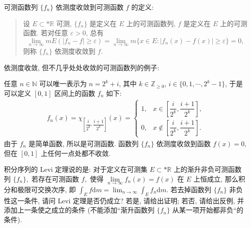 \begin{solution}
可测函数列 \(\{f_n\}\) 依测度收敛到可测函数 \(f\) 的定义: 

\begin{quote}
设 \(E \subset* \mathbb{R}\) 可测, \(\{f_n\}\) 是定义在 \(E\) 上的可测函数列, \(f\) 是定义在 \(E\) 上的可测函数. 若对任意 \(\varepsilon > 0\), 总有
\[\lim\limits_{n\to\infty} m E (\lvert f_n - f \rvert \geqslant \varepsilon) = \lim\limits_{n\to\infty} m \{ x \in E \colon \lvert f_n(x) - f(x) \rvert \geqslant \varepsilon \} = 0,\]
则称 \(\{f_n\}\) 依测度收敛到 \(f\).
\end{quote}

依测度收敛, 但不几乎处处收敛的可测函数列的例子: 

任意 \(n \in \mathbb{N}\) 可以唯一表示为 \(n = 2^k + i\), 其中 \(k \in \mathbb{Z}_{\geqslant 0}\), \(i \in \{0, 1, \cdots, 2^k - 1\}\), 于是可以定义 \([0, 1]\) 区间上的函数 \(f_n\) 如下:
\[\begin{aligned}
f_n(x) = \chi_{\left[ \dfrac{i}{2^k}, \dfrac{i+1}{2^k} \right]}(x) = \begin{cases}
1, & x \in \left[ \dfrac{i}{2^k}, \dfrac{i+1}{2^k} \right], \\
0, & x \notin \left[ \dfrac{i}{2^k}, \dfrac{i+1}{2^k} \right].
\end{cases}
\end{aligned}\]
由于 \(f_n\) 是简单函数, 所以是可测函数. 函数列 \(\{f_n\}\) 依测度收敛到函数 \(f(x) = 0,\) 但在 \([0, 1]\) 上任何一点处都不收敛.
\end{solution}

\begin{question}[points = 10]
积分序列的 Levi 定理说的是: 对于定义在可测集 $E \subset* \mathbb{R}$ 上的渐升非负可测函数列 $\{f_n\},$ 若存在可测函数 $f,$ 使得 $\lim\limits_{n\to\infty} f_n(x) = f(x)$ 在 $E$ 上恒成立, 那么积分和极限可交换次序, 即 $\displaystyle \int_E f \mathrm{d} m = \lim_{n \to \infty} \int_E f_n \mathrm{d} m.$ 若去掉函数列 $\{f_n\}$ 非负性这一条件, 请问 Levi 定理是否仍成立? 若是, 请给出证明; 若否, 请给出反例, 并添加上一条使之成立的条件 (不能添加“渐升函数列 $\{f_n\}$ 从某一项开始都非负“的条件).

\end{question}


